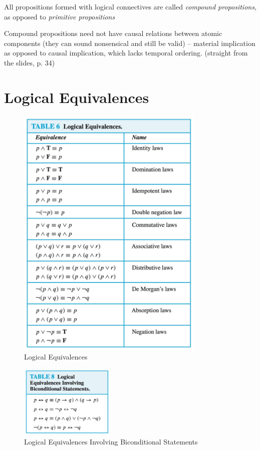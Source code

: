 \documentclass[12pt]{article}
\begin{document}
All propositions formed with logical connectives are called \textit{compound propositions},
as opposed to \textit{primitive propositions}

Compound propositions need not have causal
relations between atomic components (they
can sound nonsensical and still be valid) –
material implication as opposed to causal
implication, which lacks temporal ordering. (straight from the slides, p. 34)

\section{Logical Equivalences}

\begin{figure}[H]
    \centering
    \includegraphics[width=0.8\textwidth]{"./Logical Equivalences.jpg"}
    \caption{Logical Equivalences}
    \label{fig:logical_equivalences}
\end{figure}

\begin{figure}[H]
    \centering
    \includegraphics[width=0.4\textwidth]{"./Logical Equivalences Involving Biconditional Statements.jpg"}
    \caption{Logical Equivalences Involving Biconditional Statements}
    \label{fig:logical_equivalences_biconditional}
\end{figure}
\end{document}
